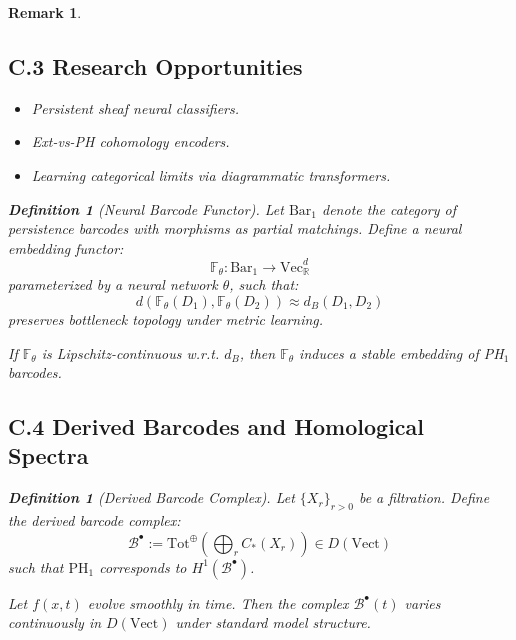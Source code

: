 \documentclass[11pt]{article}
\newtheorem{definition}[theorem]{Definition}
\newtheorem{remark}[theorem]{Remark}
\begin{document}
\begin{remark}
\subsection*{C.3 Research Opportunities}

\begin{itemize}
    \item Persistent sheaf neural classifiers.
    \item Ext-vs-PH cohomology encoders.
    \item Learning categorical limits via diagrammatic transformers.
\end{itemize}

\begin{definition}[Neural Barcode Functor]
Let $\mathrm{Bar}_1$ denote the category of persistence barcodes with morphisms as partial matchings. Define a neural embedding functor:
\[
\mathbb{F}_\theta: \mathrm{Bar}_1 \to \mathrm{Vec}_\mathbb{R}^d
\]
parameterized by a neural network $\theta$, such that:
\[
d(\mathbb{F}_\theta(D_1), \mathbb{F}_\theta(D_2)) \approx d_B(D_1, D_2)
\]
preserves bottleneck topology under metric learning.
\end{definition}

\begin{lemma}
If $\mathbb{F}_\theta$ is Lipschitz-continuous w.r.t. $d_B$, then $\mathbb{F}_\theta$ induces a stable embedding of PH$_1$ barcodes.
\end{lemma}

\subsection*{C.4 Derived Barcodes and Homological Spectra}

\begin{definition}[Derived Barcode Complex]
Let $\{X_r\}_{r > 0}$ be a filtration.  
Define the derived barcode complex:
\[
\mathcal{B}^\bullet := \mathrm{Tot}^\oplus \left( \bigoplus_{r} C_*(X_r) \right) \in D(\text{Vect})
\]
such that $\mathrm{PH}_1$ corresponds to $H^1(\mathcal{B}^\bullet)$.
\end{definition}

\begin{proposition}
Let $f(x,t)$ evolve smoothly in time. Then the complex $\mathcal{B}^\bullet(t)$ varies continuously in $D(\text{Vect})$ under standard model structure.
\end{proposition}


\end{remark}
\end{document}
